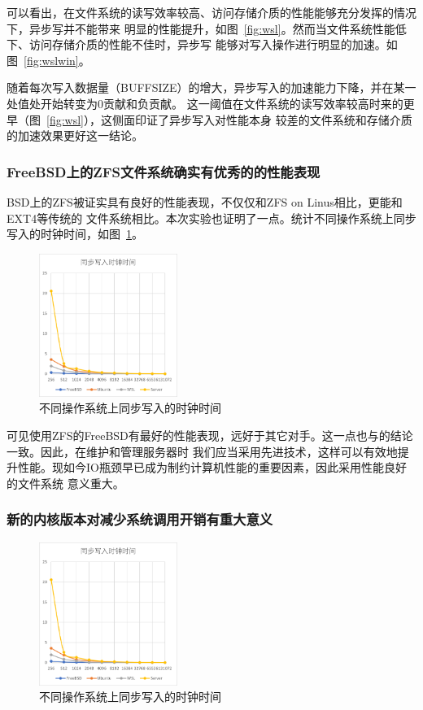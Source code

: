 \documentclass[a4paper,twoside]{article}
\begin{document}
\begin{spacing}{1.2}
可以看出，在文件系统的读写效率较高、访问存储介质的性能能够充分发挥的情况下，异步写并不能带来
明显的性能提升，如图~\ref{fig:wsl}。然而当文件系统性能低下、访问存储介质的性能不佳时，异步写
能够对写入操作进行明显的加速。如图~\ref{fig:wslwin}。

随着每次写入数据量（BUFFSIZE）的增大，异步写入的加速能力下降，并在某一处值处开始转变为0贡献和负贡献。
这一阈值在文件系统的读写效率较高时来的更早（图~\ref{fig:wsl}），这侧面印证了异步写入对性能本身
较差的文件系统和存储介质的加速效果更好这一结论。

\subsubsection{FreeBSD上的ZFS文件系统确实有优秀的的性能表现}

BSD上的ZFS\cite{rodeh2003zfs}被证实具有良好的性能表现，不仅仅和ZFS on Linus相比，更能和EXT4等传统的
文件系统相比\cite{freebsdzfs}。本次实验也证明了一点。统计不同操作系统上同步写入的时钟时间，如图~\ref{fig:allsync}。

\begin{figure}[htb]
	\centering
	\caption{不同操作系统上同步写入的时钟时间}
	\label{fig:allsync}
	\includegraphics[width=0.4\textwidth]{clock.png}
\end{figure}

可见使用ZFS的FreeBSD有最好的性能表现，远好于其它对手。这一点也与\cite{freebsdzfs}的结论一致。因此，在维护和管理服务器时
我们应当采用先进技术，这样可以有效地提升性能。现如今IO瓶颈早已成为制约计算机性能的重要因素，因此采用性能良好的文件系统
意义重大。

\subsubsection{新的内核版本对减少系统调用开销有重大意义}

\begin{figure}[htb]
	\centering
	\caption{不同操作系统上同步写入的时钟时间}
	\label{fig:allsync2}
	\includegraphics[width=0.4\textwidth]{clock.png}
\end{figure}


\end{spacing}
\end{document}
